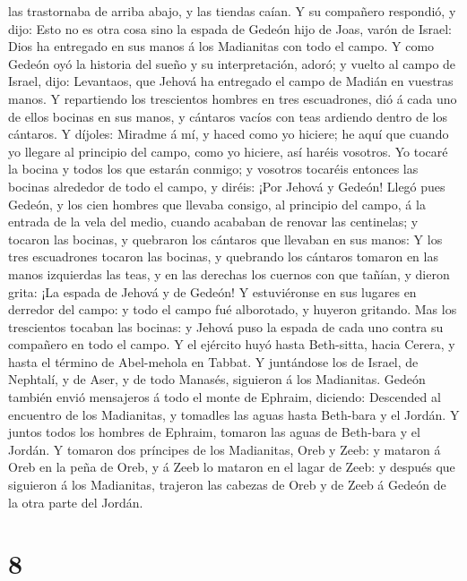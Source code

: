 las trastornaba de arriba abajo, y las tiendas caían.  Y
su compañero respondió, y dijo: Esto no es otra cosa sino la espada de
Gedeón hijo de Joas, varón de Israel: Dios ha entregado en sus manos á
los Madianitas con todo el campo.  Y como Gedeón oyó la
historia del sueño y su interpretación, adoró; y vuelto al campo de
Israel, dijo: Levantaos, que Jehová ha entregado el campo de Madián en
vuestras manos.  Y repartiendo los trescientos hombres en
tres escuadrones, dió á cada uno de ellos bocinas en sus manos, y
cántaros vacíos con teas ardiendo dentro de los cántaros.
 Y díjoles: Miradme á mí, y haced como yo hiciere; he
aquí que cuando yo llegare al principio del campo, como yo hiciere, así
haréis vosotros.  Yo tocaré la bocina y todos los que
estarán conmigo; y vosotros tocaréis entonces las bocinas alrededor de
todo el campo, y diréis: ¡Por Jehová y Gedeón!  Llegó
pues Gedeón, y los cien hombres que llevaba consigo, al principio del
campo, á la entrada de la vela del medio, cuando acababan de renovar las
centinelas; y tocaron las bocinas, y quebraron los cántaros que llevaban
en sus manos:  Y los tres escuadrones tocaron las
bocinas, y quebrando los cántaros tomaron en las manos izquierdas las
teas, y en las derechas los cuernos con que tañían, y dieron grita: ¡La
espada de Jehová y de Gedeón!  Y estuviéronse en sus
lugares en derredor del campo: y todo el campo fué alborotado, y huyeron
gritando.  Mas los trescientos tocaban las bocinas: y
Jehová puso la espada de cada uno contra su compañero en todo el campo.
Y el ejército huyó hasta Beth-sitta, hacia Cerera, y hasta el término de
Abel-mehola en Tabbat.  Y juntándose los de Israel, de
Nephtalí, y de Aser, y de todo Manasés, siguieron á los Madianitas.
 Gedeón también envió mensajeros á todo el monte de
Ephraim, diciendo: Descended al encuentro de los Madianitas, y tomadles
las aguas hasta Beth-bara y el Jordán. Y juntos todos los hombres de
Ephraim, tomaron las aguas de Beth-bara y el Jordán.  Y
tomaron dos príncipes de los Madianitas, Oreb y Zeeb: y mataron á Oreb
en la peña de Oreb, y á Zeeb lo mataron en el lagar de Zeeb: y después
que siguieron á los Madianitas, trajeron las cabezas de Oreb y de Zeeb á
Gedeón de la otra parte del Jordán.

\hypertarget{section-7}{%
\section{8}\label{section-7}}

